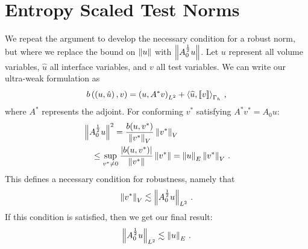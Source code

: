 \documentclass[Dissertation.tex]{subfiles}
\begin{document}
\section{Entropy Scaled Test Norms}
We repeat the argument to develop the necessary condition for a robust norm, but where we replace the bound
on $\left\| u \right\|$ with $\left\| A_0^\frac{1}{2}u \right\|$.
Let $u$ represent all volume variables, $\hat u$ all interface variables, and $v$ all test variables.
We can write our ultra-weak formulation as
\[
b\left( \left( u,\hat u \right),v \right) = \left( u,A^* v \right)_{L^2} + \left\langle \widehat{u}, \left[ \![v]\! \right] \right\rangle_{\Gamma_h}\,,
\]
where $A^*$ represents the adjoint.
For conforming $v^*$ satisfying $A^* v^* = A_0u$:
\begin{align*}
&\left\| A_0^\frac{1}{2}u \right\|^2
=\frac{b(u,v^*)}{\left\| v^* \right\|_V} \left\| v^* \right\|_V\\
&\quad\leq\sup_{v^*\neq0}\frac{|b(u,v^*)|}{\left\| v^* \right\|}\left\| v^* \right\|
=\left\| u \right\|_E \left\| v^* \right\|_V\,.
\end{align*}
This defines a necessary condition for robustness, namely that
\begin{align}
\label{eq:entropyNecessaryCondition}
\left\| v^* \right\|_V\lesssim\left\| A_0^\frac{1}{2}u \right\|_{L^2}\,.
\end{align}
If this condition is satisfied, then we get our final result:
\begin{align*}
\left\| A_0^\frac{1}{2}u \right\|_{L^2}\lesssim\left\| u \right\|_E\,.
\end{align*}
\end{document}
